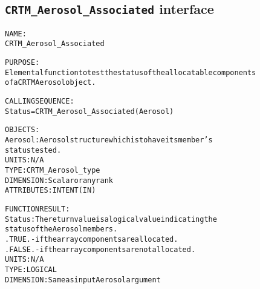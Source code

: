 \subsection{\texttt{CRTM\_Aerosol\_Associated} interface}
  \label{sec:CRTM_Aerosol_Associated_interface}
  \begin{alltt}
 
  NAME:
        CRTM_Aerosol_Associated
 
  PURPOSE:
        Elemental function to test the status of the allocatable components
        of a CRTM Aerosol object.
 
  CALLING SEQUENCE:
        Status = CRTM_Aerosol_Associated( Aerosol )
 
  OBJECTS:
        Aerosol: Aerosol structure which is to have its member's
                 status tested.
                 UNITS:      N/A
                 TYPE:       CRTM_Aerosol_type
                 DIMENSION:  Scalar or any rank
                 ATTRIBUTES: INTENT(IN)
 
  FUNCTION RESULT:
        Status:  The return value is a logical value indicating the
                 status of the Aerosol members.
                   .TRUE.  - if the array components are allocated.
                   .FALSE. - if the array components are not allocated.
                 UNITS:      N/A
                 TYPE:       LOGICAL
                 DIMENSION:  Same as input Aerosol argument
 
  \end{alltt}
